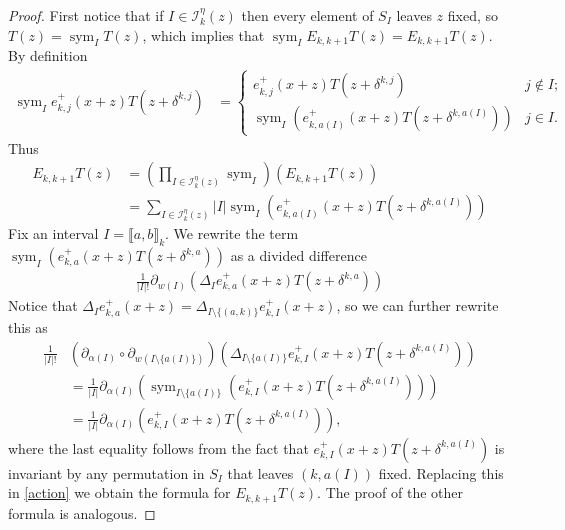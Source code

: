 \documentclass[11pt,fleqn]{article}
\newcommand\I{\mathcal I}
\newcommand\interval[1]{\llbracket #1 \rrbracket}
\DeclareMathOperator\sym{sym}
\begin{document}
\begin{proof}
First notice that if $I \in \I_k^\eta(z)$ then every element of $S_I$ leaves 
$z$ fixed, so $T(z) = \sym_I T(z)$, which implies that $\sym_I E_{k,k+1} T(z)
= E_{k,k+1} T(z)$. By definition
\begin{align*}
\sym_I e_{k,j}^+(x+z) T(z+\delta^{k,j}) 
&= \begin{cases}
e_{k,j}^+(x+z) T(z+\delta^{k,j}) & j \notin I; \\
\sym_I(e_{k,a(I)}^+(x+z) T(z + \delta^{k, a(I)})) & j \in I.
\end{cases}
\end{align*}
Thus 
\begin{align}
\label{action}
\tag{1}
E_{k,k+1} T(z)
	&= \left( 
		\prod_{I \in \I_k^\eta(z)} \sym_I 
	\right) (E_{k,k+1} T(z))\\
	&= \sum_{I \in \I_k^\eta(z)} 
		|I| \sym_I(e_{k,a(I)}^+(x+z) T(z+ \delta^{k, a(I)}))
\end{align}
Fix an interval $I = \interval{a,b}_k$. We rewrite the term 
$\sym_I(e_{k,a}^+(x+z) T(z+ \delta^{k, a}))$ as a divided difference
\begin{align*}
\frac{1}{|I|!}
	\partial_{w(I)}(\Delta_I e_{k,a}^+(x+z) T(z+ \delta^{k, a}))
\end{align*}
Notice that $\Delta_I e_{k,a}^+(x+z) = \Delta_{I \setminus \{(a,k)\}} 
e_{k,I}^+(x+z)$, so we can further rewrite this as
\begin{align*}
\frac{1}{|I|!}
	&(\partial_{\alpha(I)} \circ \partial_{w(I \setminus \{a(I)\})})
	(\Delta_{I\setminus \{a(I)\}} e_{k,I}^+(x+z) T(z+ \delta^{k, a(I)})) \\
&= \frac{1}{|I|}
	\partial_{\alpha(I)} (\sym_{I \setminus \{a(I)\}}
	(e_{k,I}^+(x+z) T(z+ \delta^{k, a(I)})))\\
&= \frac{1}{|I|} \partial_{\alpha(I)} 
	(e_{k,I}^+(x+z) T(z+ \delta^{k, a(I)})),
\end{align*}
where the last equality follows from the fact that $e_{k,I}^+(x+z) 
T(z+ \delta^{k, a(I)})$ is invariant by any permutation in $S_I$ that leaves
$(k,a(I))$ fixed. Replacing this in \ref{action} we obtain the formula for
$E_{k,k+1}T(z)$. The proof of the other formula is analogous.
\end{proof}
\end{document}
